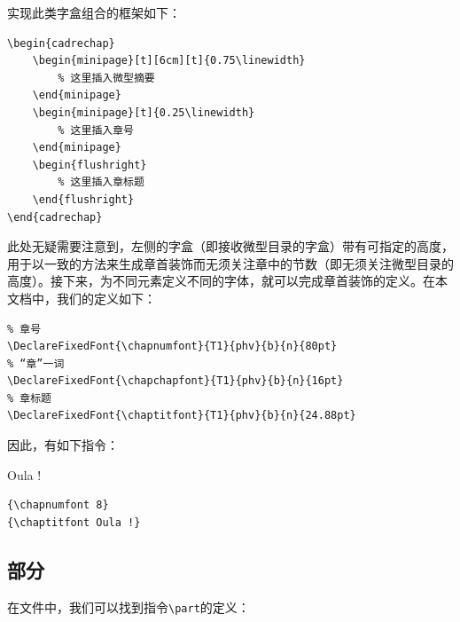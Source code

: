 
实现此类字盒组合的框架如下：

\begin{dmd}
\begin{verbatim}
\begin{cadrechap}
    \begin{minipage}[t][6cm][t]{0.75\linewidth}
        % 这里插入微型摘要 
    \end{minipage} 
    \begin{minipage}[t]{0.25\linewidth}
        % 这里插入章号
    \end{minipage}
    \begin{flushright}
        % 这里插入章标题
    \end{flushright}
\end{cadrechap}
\end{verbatim}
\end{dmd}

此处无疑需要注意到，左侧的字盒（即接收微型目录的字盒）带有可指定的高度，用于以一致的方法来生成章首装饰而无须关注章中的节数（即无须关注微型目录的高度）。接下来，为不同元素定义不同的字体，就可以完成章首装饰的定义。在本文档中，我们的定义如下：

\begin{dmd}
\begin{verbatim}
% 章号
\DeclareFixedFont{\chapnumfont}{T1}{phv}{b}{n}{80pt}
% “章”一词
\DeclareFixedFont{\chapchapfont}{T1}{phv}{b}{n}{16pt}
% 章标题
\DeclareFixedFont{\chaptitfont}{T1}{phv}{b}{n}{24.88pt}
\end{verbatim}
\end{dmd}


因此，有如下指令：

\begin{codelist}[10.2]{
    {}
    {\chaptitfont Oula !}
}\begin{verbatim}
{\chapnumfont 8}
{\chaptitfont Oula !}
\end{verbatim}
\end{codelist}

\subsection{部分}

在文件中，我们可以找到指令\verb|\part|的定义：


